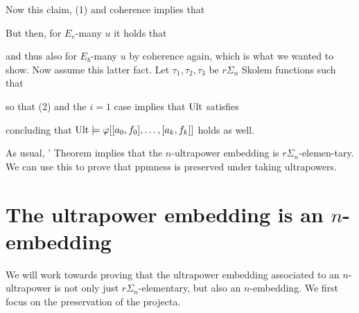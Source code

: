 {Now this claim, (1) and coherence implies that

But then, for $E_e$-many $u$ it holds that

and thus also for $E_b$-many $u$ by coherence again, which is what we wanted to show. Now assume this latter fact. Let $\tau_1,\tau_2,\tau_3$ be $r\Sigma_n$ Skolem functions such that

so that (2) and the $i=1$ case implies that $\operatorname{Ult}$ satisfies

concluding that $\operatorname{Ult}\models\varphi[[a_0,f_0],\hdots,[a_k,f_k]]$ holds as well.
}

As usual, \los' Theorem implies that the $n$-ultrapower embedding is $r\Sigma_n$-elemen-tary. We can use this to prove that ppmness is preserved under taking ultrapowers.



\section{The ultrapower embedding is an $n$-embedding}

We will work towards proving that the ultrapower embedding associated to an $n$-ultrapower is not only just $r\Sigma_n$-elementary, but also an $n$-embedding. We first focus on the preservation of the projecta.

